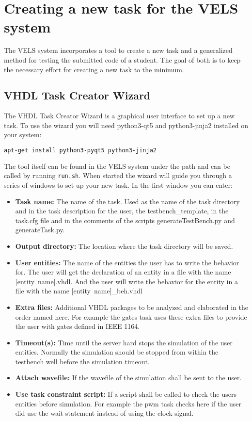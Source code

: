 \section{Creating a new task for the VELS system} \label{create_new_task}

The VELS system incorporates a tool to create a new task and a generalized method for testing the submitted code of a student. The goal of both is to keep the necessary effort for creating a new task to the minimum.

\subsection{VHDL Task Creator Wizard} \label{sub:vhdltaskcreator}
The VHDL Task Creator Wizard is a graphical user interface to set up a new task. To use the wizard you will need python3-qt5 and python3-jinja2 installed on your system:
\begin{verbatim}
apt-get install python3-pyqt5 python3-jinja2
\end{verbatim}
The tool itself can be found in the VELS system under the path  and can be called by running \verb|run.sh|.
When started the wizard will guide you through a series of windows to set up your new task. In the first window you can enter:

\begin{itemize}
\item {\bf Task name:} The name of the task. Used as the  name of the task directory and in the task description for the user, the testbench\_template, in the task.cfg file and in the comments of the scripts generateTestBench.py and generateTask.py.
\item {\bf Output directory:} The location where the task directory will be saved.
\item {\bf User entities:} The name of the entities the user has to write the behavior for. The user will get the declaration of an entity in a file with the name \mbox{[entity name].vhdl}. And the user will write the behavior for the entity in a file with the name \mbox{[entity name]\_beh.vhdl}
\item {\bf Extra files:} Additional VHDL packages to be analyzed and elaborated in the order named here. For example the gates task uses these extra files to provide the user with gates defined in IEEE 1164.
\item {} {\bf Timeout(s): } Time until the server hard stops the simulation of the user entities. Normally the simulation should be stopped from within the testbench well before the simulation timeout.
\item {\bf Attach wavefile:} If the wavefile of the simulation shall be sent to the user.
\item {\bf Use task constraint script:} If a script shall be called to check the users entities before simulation. For example the pwm task checks here if the user did use the wait statement instead of using the clock signal.
\end{itemize}

